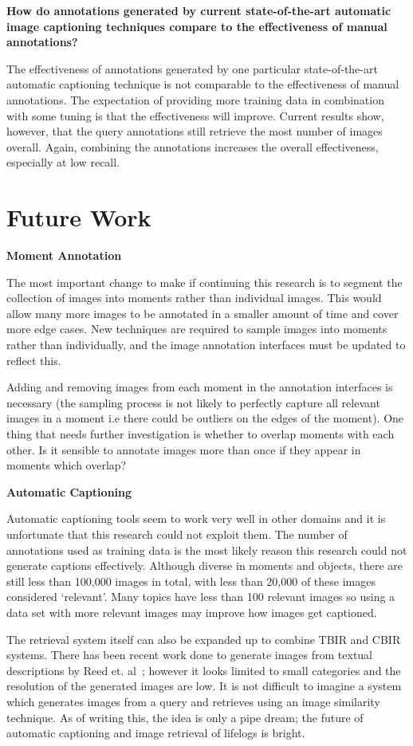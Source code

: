 \textbf{How do annotations generated by current state-of-the-art automatic image captioning techniques compare to the effectiveness of manual annotations?}

The effectiveness of annotations generated by one particular state-of-the-art automatic captioning technique is not comparable to the effectiveness of manual annotations. The expectation of providing more training data in combination with some tuning is that the effectiveness will improve. Current results show, however, that the query annotations still retrieve the most number of images overall. Again, combining the annotations increases the overall effectiveness, especially at low recall.

\section{Future Work}

\textbf{Moment Annotation}

The most important change to make if continuing this research is to segment the collection of images into moments rather than individual images. This would allow many more images to be annotated in a smaller amount of time and cover more edge cases. New techniques are required to sample images into moments rather than individually, and the image annotation interfaces must be updated to reflect this. 

Adding and removing images from each moment in the annotation interfaces is necessary (the sampling process is not likely to perfectly capture all relevant images in a moment i.e there could be outliers on the edges of the moment). One thing that needs further investigation is whether to overlap moments with each other. Is it sensible to annotate images more than once if they appear in moments which overlap?

\textbf{Automatic Captioning}

Automatic captioning tools seem to work very well in other domains and it is unfortunate that this research could not exploit them. The number of annotations used as training data is the most likely reason this research could not generate captions effectively. Although diverse in moments and objects, there are still less than 100,000 images in total, with less than 20,000 of these images considered `relevant'. Many topics have less than 100 relevant images so using a data set with more relevant images may improve how images get captioned. 

The retrieval system itself can also be expanded up to combine TBIR and CBIR systems. There has been recent work done to generate images from textual descriptions by Reed et. al~\cite{reed2016generative}; however it looks limited to small categories and the resolution of the generated images are low. It is not difficult to imagine a system which generates images from a query and retrieves using an image similarity technique. As of writing this, the idea is only a pipe dream; the future of automatic captioning and image retrieval of lifelogs is bright.

